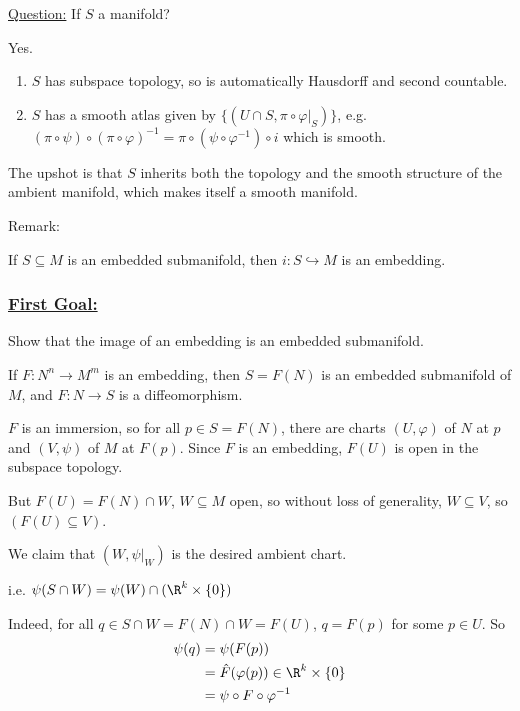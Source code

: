 \documentclass[x11names,reqno,14pt]{extarticle}
\newcommand{\into}{\hookrightarrow}
\renewcommand{\phi}{\varphi}
\begin{document}
\underline{Question:} If $S$ a manifold? 

Yes. 
\begin{enumerate}

\item $S$ has subspace topology, so is automatically Hausdorff and second countable. 

\item $S$ has a smooth atlas given by $\{(U \cap S,\pi\circ \phi|_S)\}$, e.g. $(\pi\circ\psi)\circ(\pi\circ\phi)^{-1} = \pi\circ(\psi\circ\phi^{-1})\circ i$ which is smooth.

\end{enumerate}

The upshot is that $S$ inherits both the topology and the smooth structure of the ambient manifold, which makes itself a smooth manifold. 

Remark:

If $S \subseteq M$ is an embedded submanifold, then $i:S\into M$ is an embedding.

\subsubsection*{\underline{First Goal:}}

Show that the image of an embedding is an embedded submanifold. 

\prop

If $F:N^n\to M^m$ is an embedding, then $S = F(N)$ is an embedded submanifold of $M$, and $F:N\to S$ is a diffeomorphism. 

\proof

$F$ is an immersion, so for all $p \in S = F(N)$, there are charts $(U, \phi)$ of $N$ at $p$ and $(V, \psi)$ of $M$ at $F(p)$. Since $F$ is an embedding, $F(U)$ is open in the subspace topology. 

But $F(U) = F(N) \cap W$, $W \subseteq M$ open, so without loss of generality, $W \subseteq V$, so $(F(U) \subseteq V)$. 

We claim that $(W, \psi|_W)$ is the desired ambient chart. 

i.e. $\psi(S \cap W) = \psi(W) \cap (\R^k\times\{0\})$

Indeed, for all $q \in S \cap W = F(N) \cap W = F(U)$, $q = F(p)$ for some $p\in U$. So 
\begin{align*}
\psi(q) & = \psi(F(p)) \\
					& = \hat{F}(\phi(p)) \in \R^k\times\{0\} \\
					& = \psi\circ F \circ \phi^{-1} \\
\end{align*}
\end{document}
